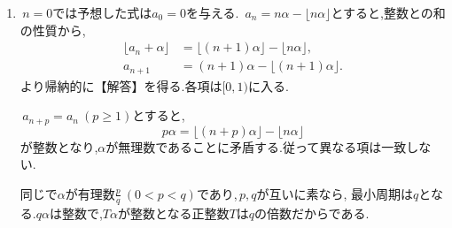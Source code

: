     \noindent {}\par\nobreak
    \begin{enumerate}[label=(\arabic*),parsep=3pt,beginpenalty=10000,format=\bookitemlink{example-gauss-role-9}{solution}{problem}]
      \item \,$n=0$では予想した式は$a_0=0$を与える.
            \,$a_n=n\alpha-\lfloor n\alpha\rfloor$とすると,整数との和の性質から,
            \begin{align*}
              \lfloor a_n+\alpha\rfloor
                &=\lfloor(n+1)\alpha\rfloor-\lfloor n\alpha\rfloor,\\
              a_{n+1}
                &=(n+1)\alpha-\lfloor(n+1)\alpha\rfloor.
            \end{align*}
            より帰納的に【解答】を得る.各項は$[0,1)$に入る.

            \,$a_{n+p}=a_n\ (p\ge1)$とすると,
            \[
              p\alpha=\lfloor(n+p)\alpha\rfloor-\lfloor n\alpha\rfloor
            \]
            が整数となり,$\alpha$が無理数であることに矛盾する.従って異なる項は一致しない.

            同じで$\alpha$が有理数$\frac pq\ (0<p<q)$であり,\,$p,q$が互いに素なら,
            最小周期は$q$となる.$q\alpha$は整数で,$T\alpha$が整数となる正整数$T$は$q$の倍数だからである.
    \end{enumerate}
